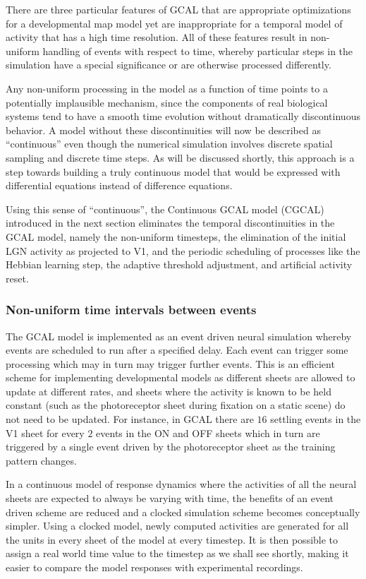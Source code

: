 \documentclass[phd,ianc,twoside]{infthesis}
\begin{document}
There are three particular features of GCAL that are appropriate
optimizations for a developmental map model yet are inappropriate for a
temporal model of activity that has a high time resolution. All of these
features result in non-uniform handling of events with respect to time,
whereby particular steps in the simulation have a special significance
or are otherwise processed differently.

Any non-uniform processing in the model as a function of time points to
a potentially implausible mechanism, since the components of real biological
systems tend to have a smooth time evolution without dramatically
discontinuous behavior. A model without these discontinuities will now
be described as ``continuous'' even though the numerical simulation
involves discrete spatial sampling and discrete time steps. As will be
discussed shortly, this approach is a step towards building a truly
continuous model that would be expressed with differential equations
instead of difference equations.

Using this sense of ``continuous'', the Continuous GCAL model (CGCAL)
introduced in the next section eliminates the temporal discontinuities
in the GCAL model, namely the non-uniform timesteps, the elimination of
the initial LGN activity as projected to V1, and the periodic
scheduling of processes like the Hebbian learning step, the
adaptive threshold adjustment, and artificial activity reset.


\subsubsection*{Non-uniform time intervals between events}

The GCAL model is implemented as an event driven neural simulation
whereby events are scheduled to run after a specified delay. Each event
can trigger some processing which may in turn may trigger further
events. This is an efficient scheme for implementing developmental
models as different sheets are allowed to update at different rates, and
sheets where the activity is known to be held constant (such as the
photoreceptor sheet during fixation on a static scene) do not need to be
updated. For instance, in GCAL there are $16$ settling events in the V1
sheet for every $2$ events in the ON and OFF sheets which in turn are
triggered by a single event driven by the photoreceptor sheet as the
training pattern changes.

In a continuous model of response dynamics where the activities of all
the neural sheets are expected to always be varying with time, the
benefits of an event driven scheme are reduced and a clocked simulation
scheme becomes conceptually simpler. Using a clocked model, newly
computed activities are generated for all the units in every sheet of
the model at every timestep. It is then possible to assign a real world
time value to the timestep as we shall see shortly, making it easier to
compare the model responses with experimental recordings.
\end{document}
